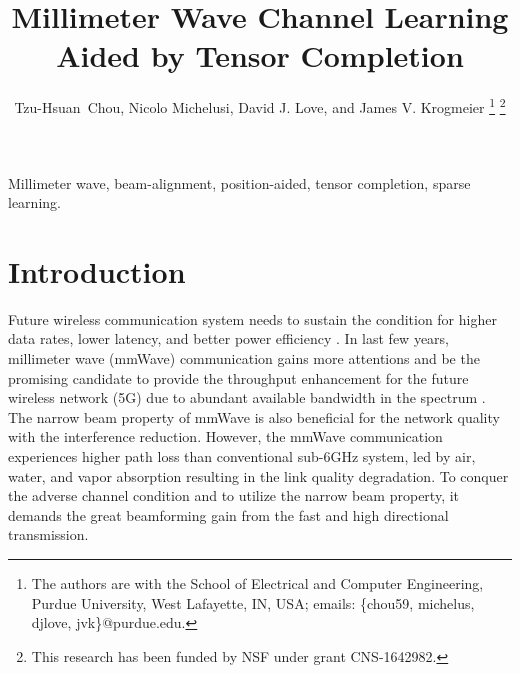 \documentclass[12pt, draftcls, onecolumn]{IEEEtran}
\theoremstyle{plain}
\theoremstyle{definition}
\theoremstyle{remark}
\newcommand{\nt}[1]{\textcolor{red}{\textbf{[#1]}}}
\begin{document}


\title{Millimeter Wave Channel Learning Aided by Tensor Completion}
\author{Tzu-Hsuan~{Chou}, Nicolo {Michelusi}, David J. {Love}, and James V. {Krogmeier}
\thanks{The authors are with the School of Electrical and Computer Engineering, Purdue University, West Lafayette, IN, USA; emails: \{chou59, michelus, djlove, jvk\}@purdue.edu.}%
\thanks{This research has been funded by NSF under grant CNS-1642982.}
}


\maketitle

\begin{abstract}
\end{abstract}

\begin{IEEEkeywords}
Millimeter wave, beam-alignment, position-aided, tensor completion, sparse learning.
\end{IEEEkeywords}

\IEEEpeerreviewmaketitle

\section{Introduction}
Future wireless communication system needs to sustain the condition for higher data rates, lower latency, and better power efficiency \cite{6824752}.
In last few years, millimeter wave (mmWave) communication gains more attentions and be the promising candidate to provide the throughput enhancement for the future wireless network (5G) due to abundant available bandwidth in the spectrum \cite{6515173,7400949,6736761,6736746}.
The narrow beam property of mmWave is also beneficial for the network quality with the interference reduction.
However, the mmWave communication experiences higher path loss than conventional sub-6GHz system, led by air, water, and vapor absorption resulting in the link quality degradation.
To conquer the adverse channel condition and to utilize the narrow beam property, it demands the great beamforming gain from the fast and high directional transmission. 
\end{document}
